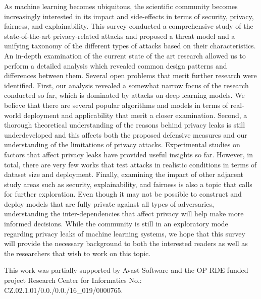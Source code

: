 \label{sec:conclusion}
As machine learning becomes ubiquitous, the scientific community becomes increasingly interested in its impact and side-effects in terms of security, privacy, fairness, and explainability. This survey conducted a comprehensive study of the state-of-the-art privacy-related attacks and proposed a threat model and a unifying taxonomy of the different types of attacks based on their characteristics. An in-depth examination of the current state of the art research allowed us to perform a detailed analysis which revealed common design patterns and differences between them. 
Several open problems that merit further research were identified. First, our analysis revealed a somewhat narrow focus of the research conducted so far, which is dominated by attacks on deep learning models. We believe that there are several popular algorithms and models in terms of real-world deployment and applicability that merit a closer examination. Second, a thorough theoretical understanding of the reasons behind privacy leaks is still underdeveloped and this affects both the proposed defensive measures and our understanding of the limitations of privacy attacks. Experimental studies on factors that affect privacy leaks have provided useful insights so far. However, in total, there are very few works that test attacks in realistic conditions in terms of dataset size and deployment. Finally, examining the impact of other adjacent study areas such as security, explainability, and fairness is also a topic that calls for further exploration. Even though it may not be possible to construct and deploy models that are fully private against all types of adversaries, understanding the inter-dependencies that affect privacy will help make more informed decisions. 
While the community is still in an exploratory mode regarding privacy leaks of machine learning systems, we hope that this survey will provide the necessary background to both the interested readers as well as the researchers that wish to work on this topic.  
\begin{acks}
This work was partially supported by Avast Software and the OP RDE funded project Research Center for Informatics No.: CZ.02.1.01/0.0./0.0./16\_019/0000765. 
\end{acks}



\endinput